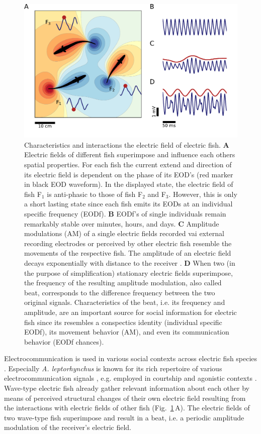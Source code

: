 \documentclass[11pt,pdftex]{article}
\newcommand{\figitem}[1]{\textsf{\bfseries\uppercase{#1}}\penalty10000 }
\newcommand{\panel}[1]{\textsf{#1}}
\newcommand{\subfref}[2]{\textup{\ref{#1}}\,\panel{#2}}
\newcommand{\fig}{Fig.}
\newcommand{\subfigref}[2]{\fig~\subfref{#1}{#2}}
\newcommand{\lepto}{\textit{A. leptorhynchus}}
\begin{document}
\begin{figure}[h!]
	\centerline{\includegraphics[width=.9\textwidth]{field_simulation}}
	\caption{\label{field_simulation} Characteristics and interactions the electric field of electric fish. \figitem{A} Electric fields of different fish superimpose and influence each others spatial properties. For each fish the current extend and direction of its electric field is dependent on the phase of its EOD's (red marker in black EOD waveform). In the displayed state, the electric field of fish F$_1$ is anti-phasic to those of fish F$_2$ and F$_3$. However, this is only a short lasting state since each fish emits its EODs at an individual specific frequency (EODf). \figitem{B} EODf's of single individuals remain remarkably stable over minutes, hours, and days. \figitem{C} Amplitude modulations (AM) of a single electric fields recorded vai external recording electrodes or perceived by other electric fish resemble the movements of the respective fish. The amplitude of an electric field decays exponentially with distance to the receiver \citep{Benda2020}. \figitem{D} When two (in the purpose of simplification) stationary electric fields superimpose, the frequency of the resulting amplitude modulation, also called beat, corresponds to the difference frequency between the two original signals. Characteristics of the beat, i.e. its frequency and amplitude, are an important source for social information for electric fish since its resembles a conspectics identity (individual specific EODf), its movement behavior (AM), and even its communication behavior (EODf chances).}
\end{figure}

Electrocommunication is used in various social contexts across electric fish species \citep{Westby1970, Hupe2008, Silva2012, Smith2013}. Especially \lepto{} is known for its rich repertoire of various electrocommunication signals \citep{Smith2013}, e.g. employed in courtship \citep{Hagedorn1985, Henninger2018} and agonistic contexts \citep{Hupe2008, Triefenbach2008}. Wave-type electric fish already gather relevant information about each other by means of perceived structural changes of their own electric field resulting from the interactions with electric fields of other fish (\subfigref{field_simulation}{A}). The electric fields of two wave-type fish superimpose and result in a beat, i.e. a periodic amplitude modulation of the receiver's electric field. 
\end{document}
